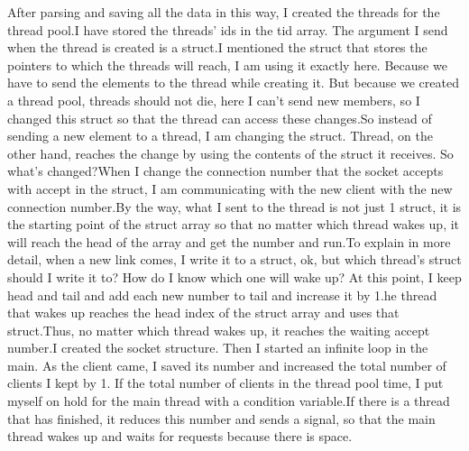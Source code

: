 \documentclass{article}
\begin{document}
After parsing and saving all the data in this way, I created the threads for the thread pool.I have stored the threads' ids in the tid array. The argument I send when the thread is created is a struct.I mentioned the struct that stores the pointers to which the threads will reach, I am using it exactly here. Because we have to send the elements to the thread while creating it. But because we created a thread pool, threads should not die, here I can't send new members, so I changed this struct so that the thread can access these changes.So instead of sending a new element to a thread, I am changing the struct. Thread, on the other hand, reaches the change by using the contents of the struct it receives.
So what's changed?When I change the connection number that the socket accepts with accept in the struct, I am communicating with the new client with the new connection number.By the way, what I sent to the thread is not just 1 struct, it is the starting point of the struct array so that no matter which thread wakes up, it will reach the head of the array and get the number and run.To explain in more detail, when a new link comes, I write it to a struct, ok, but which thread's struct should I write it to? How do I know which one will wake up? At this point, I keep head and tail and add each new number to tail and increase it by 1.he thread that wakes up reaches the head index of the struct array and uses that struct.Thus, no matter which thread wakes up, it reaches the waiting accept number.I created the socket structure. Then I started an infinite loop in the main. As the client came, I saved its number and increased the total number of clients I kept by 1. If the total number of clients in the thread pool time, I put myself on hold for the main thread with a condition variable.If there is a thread that has finished, it reduces this number and sends a signal, so that the main thread wakes up and waits for requests because there is space.
\end{document}

